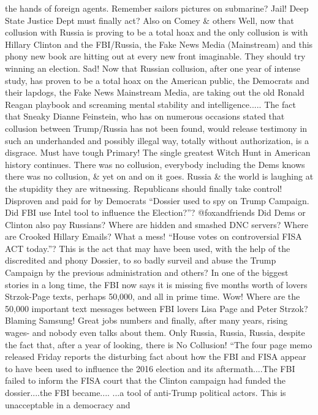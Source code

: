 the hands of foreign agents. Remember sailors pictures on submarine?
Jail! Deep State Justice Dept must finally act? Also on Comey \& others
Well, now that collusion with Russia is proving to be a total hoax and
the only collusion is with Hillary Clinton and the FBI/Russia, the Fake
News Media (Mainstream) and this phony new book are hitting out at every
new front imaginable. They should try winning an election. Sad! Now that
Russian collusion, after one year of intense study, has proven to be a
total hoax on the American public, the Democrats and their lapdogs, the
Fake News Mainstream Media, are taking out the old Ronald Reagan
playbook and screaming mental stability and intelligence..... The fact
that Sneaky Dianne Feinstein, who has on numerous occasions stated that
collusion between Trump/Russia has not been found, would release
testimony in such an underhanded and possibly illegal way, totally
without authorization, is a disgrace. Must have tough Primary! The
single greatest Witch Hunt in American history continues. There was no
collusion, everybody including the Dems knows there was no collusion, \&
yet on and on it goes. Russia \& the world is laughing at the stupidity
they are witnessing. Republicans should finally take control! Disproven
and paid for by Democrats ``Dossier used to spy on Trump Campaign. Did
FBI use Intel tool to influence the Election?''? @foxandfriends Did Dems
or Clinton also pay Russians? Where are hidden and smashed DNC servers?
Where are Crooked Hillary Emails? What a mess! ``House votes on
controversial FISA ACT today.''? This is the act that may have been
used, with the help of the discredited and phony Dossier, to so badly
surveil and abuse the Trump Campaign by the previous administration and
others? In one of the biggest stories in a long time, the FBI now says
it is missing five months worth of lovers Strzok-Page texts, perhaps
50,000, and all in prime time. Wow! Where are the 50,000 important text
messages between FBI lovers Lisa Page and Peter Strzok? Blaming Samsung!
Great jobs numbers and finally, after many years, rising wages- and
nobody even talks about them. Only Russia, Russia, Russia, despite the
fact that, after a year of looking, there is No Collusion! ``The four
page memo released Friday reports the disturbing fact about how the FBI
and FISA appear to have been used to influence the 2016 election and its
aftermath....The FBI failed to inform the FISA court that the Clinton
campaign had funded the dossier....the FBI became.... ...a tool of
anti-Trump political actors. This is unacceptable in a democracy and

